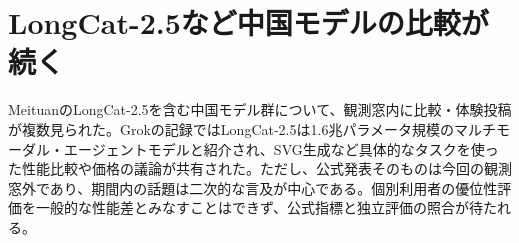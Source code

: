 \section{LongCat-2.5など中国モデルの比較が続く}
MeituanのLongCat-2.5を含む中国モデル群について、観測窓内に比較・体験投稿が複数見られた。Grokの記録ではLongCat-2.5は1.6兆パラメータ規模のマルチモーダル・エージェントモデルと紹介され、SVG生成など具体的なタスクを使った性能比較や価格の議論が共有された。ただし、公式発表そのものは今回の観測窓外であり、期間内の話題は二次的な言及が中心である。個別利用者の優位性評価を一般的な性能差とみなすことはできず、公式指標と独立評価の照合が待たれる。
